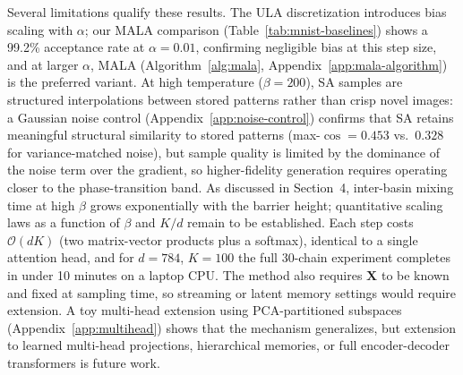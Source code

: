 Several limitations qualify these results. The ULA discretization introduces bias scaling with $\alpha$; our MALA comparison (Table~\ref{tab:mnist-baselines}) shows a 99.2\% acceptance rate at $\alpha{=}0.01$, confirming negligible bias at this step size, and at larger $\alpha$, MALA (Algorithm~\ref{alg:mala}, Appendix~\ref{app:mala-algorithm}) is the preferred variant. At high temperature ($\beta{=}200$), SA samples are structured interpolations between stored patterns rather than crisp novel images: a Gaussian noise control (Appendix~\ref{app:noise-control}) confirms that SA retains meaningful structural similarity to stored patterns (max-$\cos=0.453$ vs.\ $0.328$ for variance-matched noise), but sample quality is limited by the dominance of the noise term over the gradient, so higher-fidelity generation requires operating closer to the phase-transition band. As discussed in Section~4, inter-basin mixing time at high $\beta$ grows exponentially with the barrier height; quantitative scaling laws as a function of $\beta$ and $K/d$ remain to be established. Each step costs $\mathcal{O}(dK)$ (two matrix-vector products plus a softmax), identical to a single attention head, and for $d{=}784$, $K{=}100$ the full 30-chain experiment completes in under 10 minutes on a laptop CPU. The method also requires $\mathbf{X}$ to be known and fixed at sampling time, so streaming or latent memory settings would require extension. A toy multi-head extension using PCA-partitioned subspaces (Appendix~\ref{app:multihead}) shows that the mechanism generalizes, but extension to learned multi-head projections, hierarchical memories, or full encoder-decoder transformers is future work.
